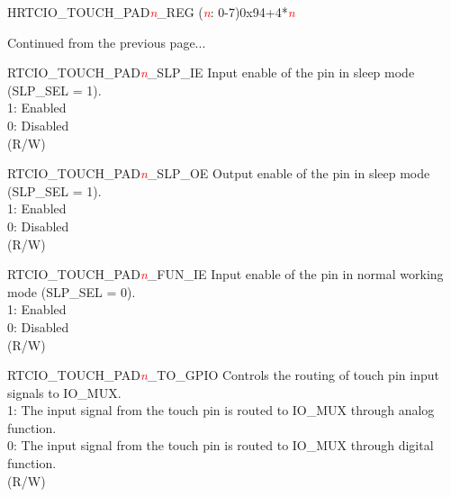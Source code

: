 \begin{register}{H}{RTCIO\_TOUCH\_PAD\textcolor{red}{\it{n}}\_REG (\textcolor{red}{\it{n}}: 0-7)}{0x94+4*\textcolor{red}{\it{n}}}
\begin{regdesc}\begin{reglist}
\item [Continued from the previous page...]
\item[RTCIO\_TOUCH\_PAD\textcolor{red}{\it{n}}\_SLP\_IE] Input enable of the pin in sleep mode (SLP\_SEL = 1). \\
1: Enabled \\
0: Disabled \\
(R/W)
\item[RTCIO\_TOUCH\_PAD\textcolor{red}{\it{n}}\_SLP\_OE] Output enable of the pin in sleep mode (SLP\_SEL = 1). \\
1: Enabled\\
0: Disabled\\
(R/W)
\item[RTCIO\_TOUCH\_PAD\textcolor{red}{\it{n}}\_FUN\_IE] Input enable of the pin in normal working mode (SLP\_SEL = 0).\\
1: Enabled \\
0: Disabled \\
(R/W)
\item[RTCIO\_TOUCH\_PAD\textcolor{red}{\it{n}}\_TO\_GPIO] Controls the routing of touch pin input signals to IO\_MUX. \\
1: The input signal from the touch pin is routed to IO\_MUX through analog function.\\
0: The input signal from the touch pin is routed to IO\_MUX through digital function. \\
(R/W)
\end{reglist}\end{regdesc}
\end{register}


